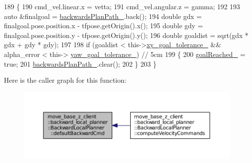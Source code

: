 \begin{DoxyCode}
189 \{
190     cmd\_vel.linear.x = vetta;
191     cmd\_vel.angular.z = gamma;
192 
193     \textcolor{keyword}{auto} &finalgoal = \hyperlink{classmove__base__z__client_1_1backward__local__planner_1_1BackwardLocalPlanner_a451add2af7d6d83a7415277311b3ed04}{backwardsPlanPath\_}.back();
194     \textcolor{keywordtype}{double} gdx = finalgoal.pose.position.x - tfpose.getOrigin().x();
195     \textcolor{keywordtype}{double} gdy = finalgoal.pose.position.y - tfpose.getOrigin().y();
196     \textcolor{keywordtype}{double} goaldist = sqrt(gdx * gdx + gdy * gdy);
197 
198     \textcolor{keywordflow}{if} (goaldist < this->\hyperlink{classmove__base__z__client_1_1backward__local__planner_1_1BackwardLocalPlanner_a89ab1ee7283a474dc19970789f51c087}{xy\_goal\_tolerance\_} && alpha\_error < this->
      \hyperlink{classmove__base__z__client_1_1backward__local__planner_1_1BackwardLocalPlanner_a10d15842054d518159baa535afe6f1fd}{yaw\_goal\_tolerance\_}) \textcolor{comment}{// 5cm}
199     \{
200         \hyperlink{classmove__base__z__client_1_1backward__local__planner_1_1BackwardLocalPlanner_a0a89141d3d3a8ebfb9e1d69d0d33fd49}{goalReached\_} = \textcolor{keyword}{true};
201         \hyperlink{classmove__base__z__client_1_1backward__local__planner_1_1BackwardLocalPlanner_a451add2af7d6d83a7415277311b3ed04}{backwardsPlanPath\_}.clear();
202     \}
203 \}
\end{DoxyCode}


Here is the caller graph for this function\+:
\nopagebreak
\begin{figure}[H]
\begin{center}
\leavevmode
\includegraphics[width=350pt]{classmove__base__z__client_1_1backward__local__planner_1_1BackwardLocalPlanner_a9f3977494d5f80884eb1a1d09b5b4673_icgraph}
\end{center}
\end{figure}


